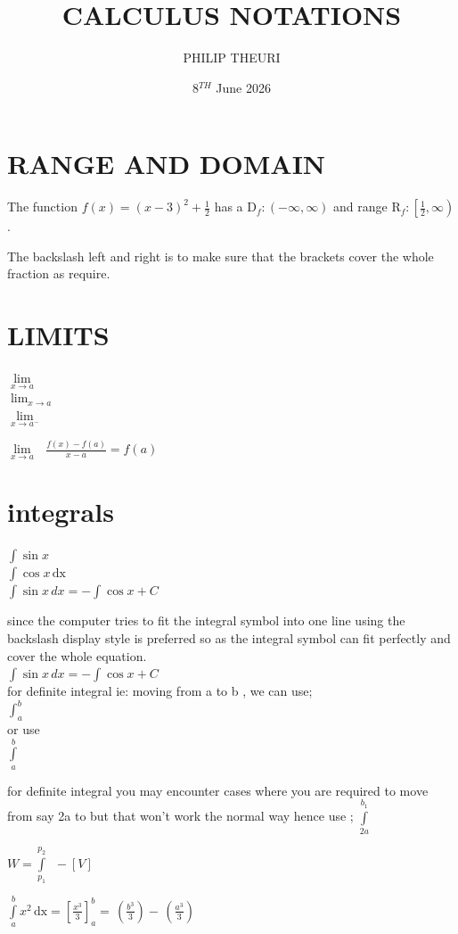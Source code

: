 \documentclass[11pt]{article}
\title{CALCULUS NOTATIONS}
\author{PHILIP THEURI}
\date{8$^{TH}$ June 2026}
\begin{document}
	\maketitle
	\section{RANGE AND DOMAIN}
The function $f(x)=(x-3)^2+\frac{1}{2}$ has a $\mathrm{D}_f:(-\infty,\infty)$ and range $\mathrm{R}_f:\left[\frac{1}{2},\infty\right)$.
	
The backslash left and right is to make sure that the brackets cover the whole fraction as require.
\section{LIMITS}
$\lim\limits_{x\to a}$\\[6pt]
$\lim_{x \to a}$\\

$\displaystyle{\lim\limits_{x\to a^-}}$
	
	
	$\displaystyle{\lim\limits_{x \to a }\, \, \, \, \frac{f(x)-f(a)}{x-a}=f(a)}$
\section{integrals}	
	
	$\int\sin x$\\
	$\int\cos x \,\mathrm{dx}$\\
	$\int \sin x \, dx=-\int \cos x + C$
	
	since the computer tries to fit the integral symbol into one line using the backslash display style is preferred so as the integral symbol can fit perfectly and cover the whole equation.\\
	$\displaystyle{\int \sin x \, dx =-\int \cos x + C}$\\
for definite integral ie: moving from a to b , we can use;\\	
	$\displaystyle{\int_a^b}$\\
	
	or use\\ $\displaystyle{\int\limits_a^b}$
	
	for definite integral you may encounter cases where you are required to move from say 2a to but that won't work the normal way hence use ;
	$\displaystyle{\int\limits_{2a}^{b_1}}$
	
	$W=\displaystyle{\int\limits_{p_1}^{p_2} \, \, \,-\left[V\right]}$
	
	$\displaystyle{\int\limits_{a}^{b}x^2 \, \mathrm{dx}=\left[\frac{x^3}{3}\right]_{a}^{b}=\,  \left(\frac{b^3}{3}\right)-\, \left(\frac{a^3}{3}\right)}$\\
	
\end{document}
